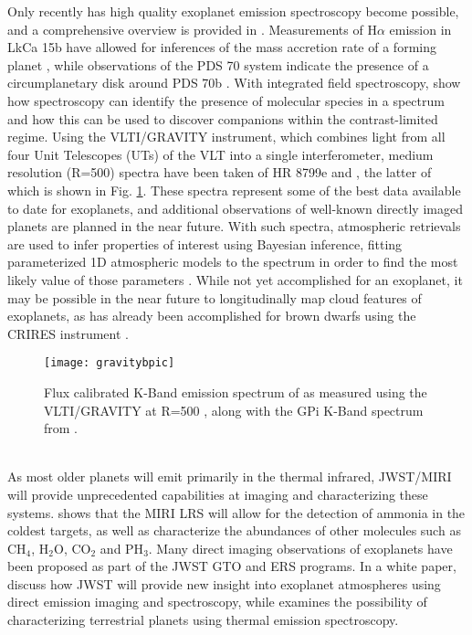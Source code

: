 Only recently has high quality exoplanet emission spectroscopy become possible, and a comprehensive overview is provided in \parencite{Biller2018}.
Measurements of H$\alpha$ emission in LkCa 15b have allowed for inferences of the mass accretion rate of a forming planet \parencite{Sallum2015}, while observations of the PDS 70 system indicate the presence of a circumplanetary disk around PDS 70b \parencite{Keppler2018,Christiaens2019}.
With integrated field spectroscopy, \parencite{Hoeijmakers2018} show how spectroscopy can identify the presence of molecular species in a spectrum and how this can be used to discover companions within the contrast-limited regime.
Using the VLTI/GRAVITY instrument, which combines light from all four Unit Telescopes (UTs) of the VLT into a single interferometer, medium resolution (R=500) spectra have been taken of HR 8799e \parencite{Lacour2019} and \bpic \parencite{GRAVITYCollaboration2019}, the latter of which is shown in Fig. \ref{fig:gravitybpic}. 
These spectra represent some of the best data available to date for exoplanets, and additional observations of well-known directly imaged planets are planned in the near future.
With such spectra, atmospheric retrievals are used to infer properties of interest using Bayesian inference, fitting parameterized 1D atmospheric models to the spectrum in order to find the most likely value of those parameters \parencite{Madhusudhan2009}. 
While not yet accomplished for an exoplanet, it may be possible in the near future to longitudinally map cloud features of exoplanets, as has already been accomplished for brown dwarfs using the CRIRES instrument \parencite{Crossfield2014}.
\begin{figure}[t]
	\texttt{[image: gravitybpic]}
	\caption{Flux calibrated K-Band emission spectrum of \bpic as measured using the VLTI/GRAVITY at R=500 \parencite{GRAVITYCollaboration2019}, along with the GPi K-Band spectrum from \parencite{Chilcote2017}.}
	\label{fig:gravitybpic}
\end{figure}\\

As most older planets will emit primarily in the thermal infrared, JWST/MIRI will provide unprecedented capabilities at imaging and characterizing these systems.
\parencite{Danielski2018} shows that the MIRI LRS will allow for the detection of ammonia in the coldest targets, as well as characterize the abundances of other molecules such as CH$_{4}$, H$_{2}$O, CO$_{2}$ and PH$_{3}$.
Many direct imaging observations of exoplanets have been proposed as part of the JWST GTO and ERS programs. In a white paper, \parencite{Beichman2019} discuss how JWST will provide new insight into exoplanet atmospheres using direct emission imaging and spectroscopy, while \parencite{Line2019} examines the possibility of characterizing terrestrial planets using thermal emission spectroscopy. 

